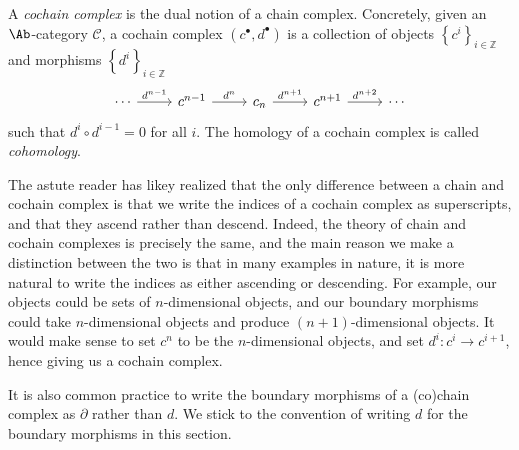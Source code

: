 \begin{remark}\label{2.8}
	A \emph{cochain complex} is the dual notion of a chain complex. Concretely, given an $\Ab $-category $\mathcal{C} $, a cochain complex $(c ^{\bullet} ,d^{\bullet} )$ is a collection of objects $\left\{ c^i \right\} _{i\in\mathbb{Z} } $ and morphisms $\left\{ d^i \right\} _{i\in\mathbb{Z} } $
	\[\begin{tikzcd}[row sep = 2.5em, column sep = 2.5em]
	\cdots \ar[" d^{n-1}  ", r]  & c^{n-1} \ar[" d^n ", r]  & c_n \ar[" d^{n+1}  ", r]  & c^{n+1} \ar[" d^{n+2}  ", r]  & \cdots 
	\end{tikzcd}\]
	such that $d^i \circ d^{i-1} =0$ for all $i$. The homology of a cochain complex is called \emph{cohomology}.

	The astute reader has likey realized that the only difference between a chain and cochain complex is that we write the indices of a cochain complex as superscripts, and that they ascend rather than descend. Indeed, the theory of chain and cochain complexes is precisely the same, and the main reason we make a distinction between the two is that in many examples in nature, it is more natural to write the indices as either ascending or descending. For example, our objects could be sets of $n$-dimensional objects, and our boundary morphisms could take $n$-dimensional objects and produce $(n+1)$-dimensional objects. It would make sense to set $c^n$ to be the $n$-dimensional objects, and set $d^i : c^i \to c^{i+1} $, hence giving us a cochain complex.
\end{remark}

\begin{convention}\label{2.9}
	It is also common practice to write the boundary morphisms of a (co)chain complex as $\partial$ rather than $d$. We stick to the convention of writing $d$ for the boundary morphisms in this section.
\end{convention}

